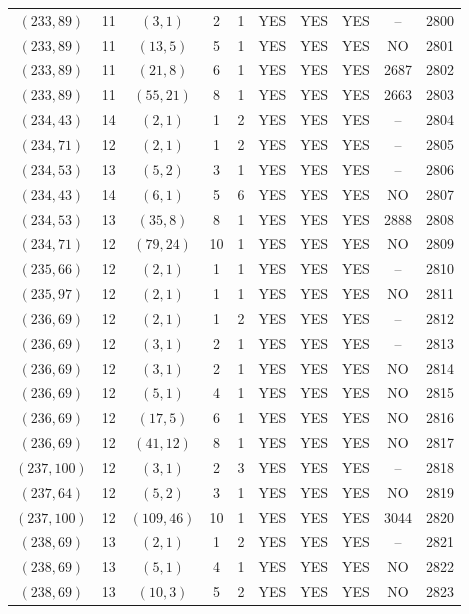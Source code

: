 \begin{longtable}{|c|c|c|c|c|c|c|c|c|c|}
$(233, 89)$ & 11 & $(3, 1)$ & 2 & 1 & YES & YES & YES & -- & 2800\\
$(233, 89)$ & 11 & $(13, 5)$ & 5 & 1 & YES & YES & YES & NO & 2801\\
$(233, 89)$ & 11 & $(21, 8)$ & 6 & 1 & YES & YES & YES & 2687 & 2802\\
$(233, 89)$ & 11 & $(55, 21)$ & 8 & 1 & YES & YES & YES & 2663 & 2803\\
$(234, 43)$ & 14 & $(2, 1)$ & 1 & 2 & YES & YES & YES & -- & 2804\\
$(234, 71)$ & 12 & $(2, 1)$ & 1 & 2 & YES & YES & YES & -- & 2805\\
$(234, 53)$ & 13 & $(5, 2)$ & 3 & 1 & YES & YES & YES & -- & 2806\\
$(234, 43)$ & 14 & $(6, 1)$ & 5 & 6 & YES & YES & YES & NO & 2807\\
$(234, 53)$ & 13 & $(35, 8)$ & 8 & 1 & YES & YES & YES & 2888 & 2808\\
$(234, 71)$ & 12 & $(79, 24)$ & 10 & 1 & YES & YES & YES & NO & 2809\\
$(235, 66)$ & 12 & $(2, 1)$ & 1 & 1 & YES & YES & YES & -- & 2810\\
$(235, 97)$ & 12 & $(2, 1)$ & 1 & 1 & YES & YES & YES & NO & 2811\\
$(236, 69)$ & 12 & $(2, 1)$ & 1 & 2 & YES & YES & YES & -- & 2812\\
$(236, 69)$ & 12 & $(3, 1)$ & 2 & 1 & YES & YES & YES & -- & 2813\\
$(236, 69)$ & 12 & $(3, 1)$ & 2 & 1 & YES & YES & YES & NO & 2814\\
$(236, 69)$ & 12 & $(5, 1)$ & 4 & 1 & YES & YES & YES & NO & 2815\\
$(236, 69)$ & 12 & $(17, 5)$ & 6 & 1 & YES & YES & YES & NO & 2816\\
$(236, 69)$ & 12 & $(41, 12)$ & 8 & 1 & YES & YES & YES & NO & 2817\\
$(237, 100)$ & 12 & $(3, 1)$ & 2 & 3 & YES & YES & YES & -- & 2818\\
$(237, 64)$ & 12 & $(5, 2)$ & 3 & 1 & YES & YES & YES & NO & 2819\\
$(237, 100)$ & 12 & $(109, 46)$ & 10 & 1 & YES & YES & YES & 3044 & 2820\\
$(238, 69)$ & 13 & $(2, 1)$ & 1 & 2 & YES & YES & YES & -- & 2821\\
$(238, 69)$ & 13 & $(5, 1)$ & 4 & 1 & YES & YES & YES & NO & 2822\\
$(238, 69)$ & 13 & $(10, 3)$ & 5 & 2 & YES & YES & YES & NO & 2823\\

\end{longtable}
